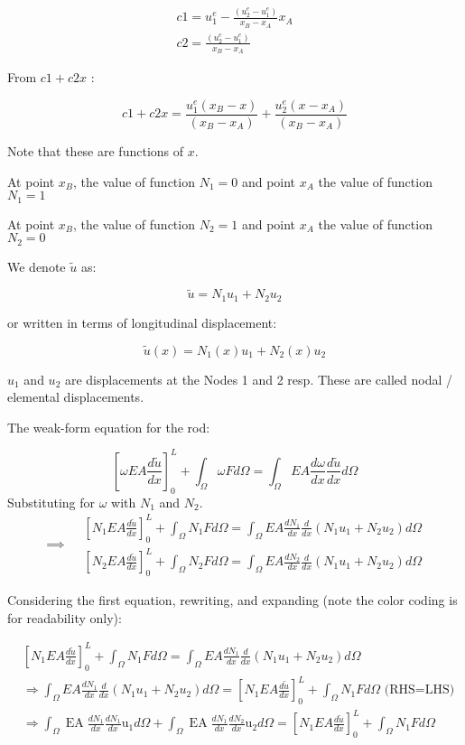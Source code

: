 \documentclass[10pt]{article}
\begin{document}
$$
\begin{gathered}
c 1=u_{1}^{e}-\frac{\left(u_{2}^{e}-u_{1}^{e}\right)}{x_{B}-x_{A}} x_{A} \\
c 2=\frac{\left(u_{2}^{e}-u_{1}^{e}\right)}{x_{B}-x_{A}}
\end{gathered}
$$

From $c 1+c 2 x$ :

$$
c 1+c 2 x=\frac{u_{1}^{e}\left(x_{B}-x\right)}{\left(x_{B}-x_{A}\right)}+\frac{u_{2}^{e}\left(x-x_{A}\right)}{\left(x_{B}-x_{A}\right)}
$$

Note that these are functions of $x$.

At point $x_{B}$, the value of function $N_{1}=0$ and point $x_{A}$ the value of function $N_{1}=1$

At point $x_{B}$, the value of function $N_{2}=1$ and point $x_{A}$ the value of function $N_{2}=0$

We denote $\tilde{u}$ as:

$$
\tilde{u}=N_{1} u_{1}+N_{2} u_{2}
$$

or written in terms of longitudinal displacement:

$$
\tilde{u}(x)=N_{1}(x) u_{1}+N_{2}(x) u_{2}
$$

$u_{1}$ and $u_{2}$ are displacements at the Nodes 1 and 2 resp. These are called nodal / elemental displacements.

The weak-form equation for the rod:

$$
\left[\omega E A \frac{d \tilde{u}}{d x}\right]_{0}^{L}+\int_{\Omega} \omega F d \Omega=\int_{\Omega} E A \frac{d \omega}{d x} \frac{d \tilde{u}}{d x} d \Omega
$$
Substituting for $\omega$ with $N_1$ and $N_2$.
$$
\implies \begin{aligned}
& {\left[N_{1} E A \frac{d \tilde{u}}{d x}\right]_{0}^{L}+\int_{\Omega} N_{1} F d \Omega=\int_{\Omega} E A \frac{d N_{1}}{d x} \frac{d}{d x}\left(N_{1} u_{1}+N_{2} u_{2}\right) d \Omega} \\
& {\left[N_{2} E A \frac{d \tilde{u}}{d x}\right]_{0}^{L}+\int_{\Omega} N_{2} F d \Omega=\int_{\Omega} E A \frac{d N_{2}}{d x} \frac{d}{d x}\left(N_{1} u_{1}+N_{2} u_{2}\right) d \Omega}
\end{aligned}
$$

Considering the first equation, rewriting, and expanding (note the color coding is for readability only):

$$
\begin{aligned}
& {\left[N_{1} E A \frac{d \widetilde{u}}{d x}\right]_{0}^{L}+\int_{\Omega} N_{1} F d \Omega=\int_{\Omega} E A \frac{d N_{1}}{d x} \frac{d}{d x}\left(N_{1} u_{1}+N_{2} u_{2}\right) d \Omega} \\
& \Rightarrow \int_{\Omega} E A \frac{d N_{1}}{d x} \frac{d}{d x}\left(N_{1} u_{1}+N_{2} u_{2}\right) d \Omega=\left[N_{1} E A \frac{d \tilde{u}}{d x}\right]_{0}^{L}+\int_{\Omega} N_{1} F d \Omega \text { (RHS=LHS) } \\
& \Rightarrow \int_{\Omega} \operatorname{EA} \frac{d N_{1}}{d x} \frac{d N_{1}}{d x} \mathrm{u}_{1} d \Omega+\int_{\Omega} \operatorname{EA} \frac{d N_{1}}{d x} \frac{d N_{2}}{d x} \mathrm{u}_{2} d \Omega=\left[N_{1} E A \frac{d \tilde{u}}{d x}\right]_{0}^{L}+\int_{\Omega} N_{1} F d \Omega
\end{aligned}
$$
\end{document}
